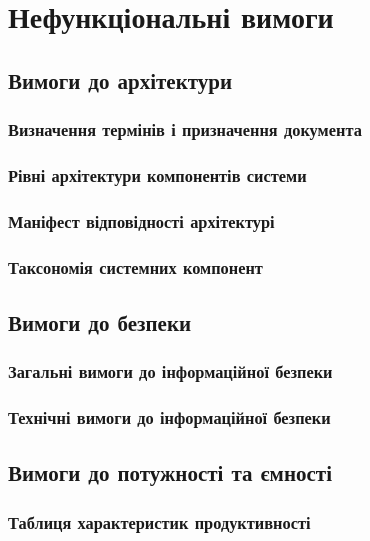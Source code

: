 \newpage
\section{Нефункціональні вимоги}

\subsection{Вимоги до архітектури}

\subsubsection{Визначення термінів і призначення документа}

\subsubsection{Рівні архітектури компонентів системи}

\subsubsection{Маніфест відповідності архітектурі}

\subsubsection{Таксономія системних компонент}

\subsection{Вимоги до безпеки}

\subsubsection{Загальні вимоги до інформаційної безпеки}

\subsubsection{Технічні вимоги до інформаційної безпеки}

\subsection{Вимоги до потужності та ємності}

\subsubsection{Таблиця характеристик продуктивності}

